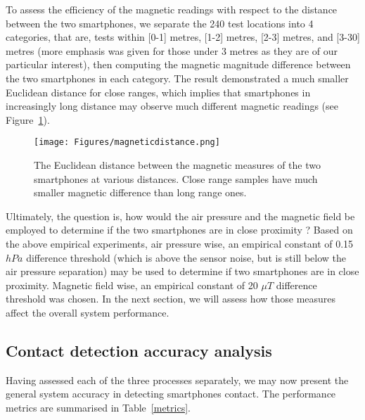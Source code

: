 \documentclass[graybox]{svmult}
\begin{document}
To assess the efficiency of the magnetic readings with respect to the distance between the two smartphones, we separate the 240 test locations into 4 categories, that are, tests within [0-1] metres, [1-2] metres, [2-3] metres, and [3-30] metres (more emphasis was given for those under 3 metres as they are of our particular interest), then computing the magnetic magnitude difference between the two smartphones in each category. The result demonstrated a much smaller Euclidean distance for close ranges, which implies that smartphones in increasingly long distance may observe much different magnetic readings (see Figure~\ref{magneticdistance}).
\begin{figure}[h]
    \centering
    \sidecaption
    \texttt{[image: Figures/magneticdistance.png]}
    \caption{The Euclidean distance between the magnetic measures of the two smartphones at various distances. Close range samples have much smaller magnetic difference than long range ones.}
    \label{magneticdistance}       
\end{figure}

Ultimately, the question is, how would the air pressure and the magnetic field be employed to determine if the two smartphones are in close proximity ? Based on the above empirical experiments, air pressure wise, an empirical constant of 0.15 $hPa$ difference threshold (which is above the sensor noise, but is still below the air pressure separation) may be used to determine if two smartphones are in close proximity. Magnetic field wise, an empirical constant of 20 $\mu T$ difference threshold was chosen. In the next section, we will assess how those measures affect the overall system performance.



\subsection{Contact detection accuracy analysis}
\label{sec:accuracy}
Having assessed each of the three processes separately, we may now present the general system accuracy in detecting smartphones contact. The performance metrics are summarised in Table~\ref{metrics}.
\end{document}
